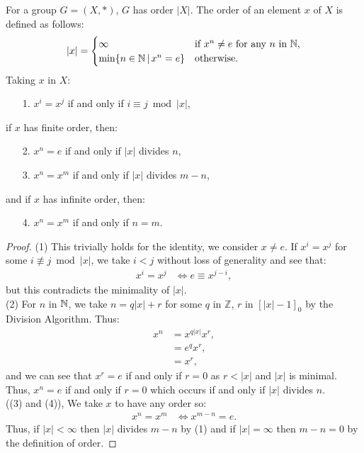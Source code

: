 For a group $G = (X, \ast)$, $G$ has order $|X|$. The order of an element $x$ of
$X$ is defined as follows: \begin{align*}
    |x| = \begin{cases}
        \infty & \text{if $x^n \neq e$ for any $n$ in $\mathbb{N}$}, \\
        \min\{n \in \mathbb{N} \, | \, x^n = e\} & \text{otherwise}. 
    \end{cases}
\end{align*} Taking $x$ in $X$: \begin{itemize}
    \item[1.] $x^i = x^j$ if and only if $i \equiv j \bmod |x|$,
\end{itemize} if $x$ has finite order, then: \begin{itemize}
    \item[2.] $x^n = e$ if and only if $|x|$ divides $n$,
    \item[3.] $x^n = x^m$ if and only if $|x|$ divides $m - n$,
\end{itemize} and if $x$ has infinite order, then: \begin{itemize}
    \item[4.] $x^n = x^m$ if and only if $n = m$.
\end{itemize} 

\begin{proof}
    (1) This trivially holds for the identity, we consider
    $x \neq e$. If $x^i = x^j$ for some $i \not\equiv j \bmod |x|$,
    we take $i < j$ without loss of generality and see that:
    \begin{align*}
        x^i = x^j 
        &\Longleftrightarrow e \equiv x^{j - i},
    \end{align*} but this contradicts the minimality of $|x|$.
    \\[\baselineskip]
    (2) For $n$ in $\mathbb{N}$, we take $n = q|x| + r$ for some $q$ 
    in $\mathbb{Z}$, $r$ in $[|x| - 1]_0$ by the 
    Division Algorithm. Thus: \begin{align*}
        x^n &= x^{q|x|}x^r, \\
        &= e^qx^r, \\
        &= x^r,
    \end{align*} and we can see that $x^r = e$ if and only if $r = 0$ as $r < |x|$
    and $|x|$ is minimal. Thus, $x^n = e$ if and only if $r = 0$ which occurs
    if and only if $|x|$ divides $n$.
    \\[\baselineskip]
    ((3) and (4)), We take $x$ to have any order so: \begin{align*}
        x^n = x^m &\Longleftrightarrow x^{m - n} = e.
    \end{align*} Thus, if $|x| < \infty$ then $|x|$ divides $m - n$ by (1) and
    if $|x| = \infty$ then $m - n = 0$ by the definition of order.
\end{proof}

